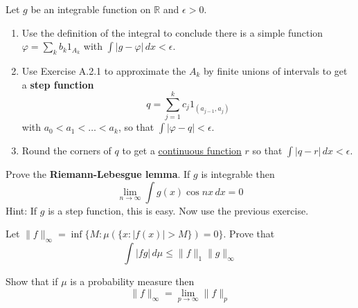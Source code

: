   \begin{exercise}[Durrett 1.4.3]
    Let $g$ be an integrable function on $\mathbb{R}$ and $\epsilon > 0$.
    \begin{enumerate}
      \item Use the definition of the integral to conclude there is a simple function $\varphi = \sum_{k} b_k 1_{A_k}$ with $\int |g - \varphi| \, dx < \epsilon$.
      \item Use Exercise A.2.1 to approximate the $A_k$ by finite unions of intervals to get a \textbf{step function}
      \begin{equation*}
        q = \sum_{j=1}^{k} c_j 1_{(a_{j-1}, a_j)}
      \end{equation*}
      with $a_0 < a_1 < \dots < a_k$, so that $\int |\varphi - q| < \epsilon$.
      \item Round the corners of $q$ to get a \hyperref[pst-def:continuous_func]{continuous function} $r$ so that $\int |q - r| \, dx < \epsilon$.
    \end{enumerate}
  \end{exercise}
  \begin{solution}

  \end{solution}

  \begin{exercise}[Durrett 1.4.4]
    Prove the \textbf{Riemann-Lebesgue lemma}. If $g$ is integrable then
    \begin{equation*}
      \lim_{n \to \infty} \int g(x) \cos nx \, dx = 0
    \end{equation*}
    Hint: If $g$ is a step function, this is easy. Now use the previous exercise.
  \end{exercise}
  \begin{solution}

  \end{solution}

  \begin{exercise}[Durrett 1.5.1]
    Let $\|f\|_{\infty} = \inf\{M : \mu(\{x : |f(x)| > M\}) = 0\}$. Prove that
    \begin{equation*}
      \int |fg| \, d\mu \leq \|f\|_1 \|g\|_{\infty}
    \end{equation*}
  \end{exercise}
  \begin{solution}

  \end{solution}

  \begin{exercise}[Durrett 1.5.2]
    Show that if $\mu$ is a probability measure then
    \begin{equation*}
      \|f\|_{\infty} = \lim_{p \to \infty} \|f\|_p
    \end{equation*}
  \end{exercise}
  \begin{solution}

  \end{solution}

